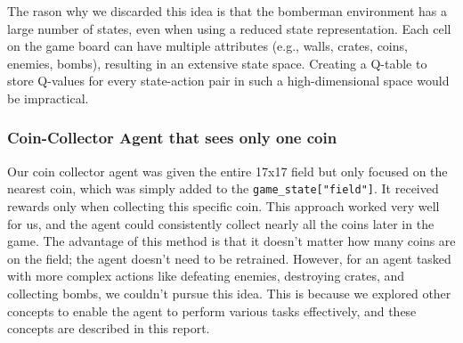 The rason why we discarded this idea is that the bomberman environment has a large number of states, even when using a reduced state representation. 
Each cell on the game board can have multiple attributes (e.g., walls, crates, coins, enemies, bombs), resulting in an extensive state space. 
Creating a Q-table to store Q-values for every state-action pair in such a high-dimensional space would be impractical.


\subsubsection{Coin-Collector Agent that sees only one coin}

Our coin collector agent was given the entire 17x17 field but only focused on the nearest coin, which was simply added to the \verb|game_state["field"]|. 
It received rewards only when collecting this specific coin. This approach worked very well for us, and the agent could consistently collect nearly 
all the coins later in the game. The advantage of this method is that it doesn't matter how many coins are on the field; the agent doesn't need to be 
retrained. However, for an agent tasked with more complex actions like defeating enemies, destroying crates, and collecting bombs, we couldn't 
pursue this idea. This is because we explored other concepts to enable the agent to perform various tasks effectively, and these concepts are described in this report.